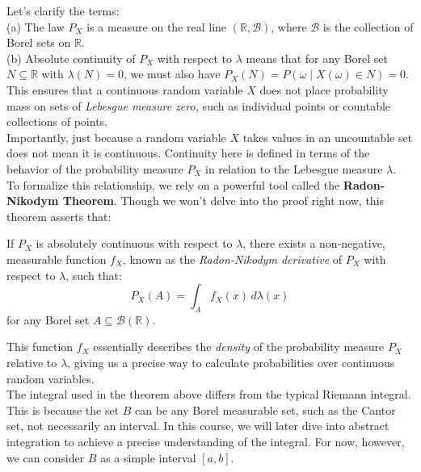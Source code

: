 Let’s clarify the terms:\\

(a) The law \(P_X\) is a measure on the real line \((\mathbb{R}, \mathcal{B})\), where \(\mathcal{B}\) is the collection of Borel sets on \(\mathbb{R}\).\\
(b) Absolute continuity of \(P_X\) with respect to \(\lambda\) means that for any Borel set \(N \subseteq \mathbb{R}\) with \(\lambda(N) = 0\), we must also have \(P_X(N) = P(\omega \mid X(\omega) \in N) = 0\).\\

This ensures that a continuous random variable \(X\) does not place probability mass on sets of \textit{Lebesgue measure zero,} such as individual points or countable collections of points.\\

Importantly, just because a random variable \(X\) takes values in an uncountable set does not mean it is continuous. Continuity here is defined in terms of the behavior of the probability measure \(P_X\) in relation to the Lebesgue measure \(\lambda\).\\

To formalize this relationship, we rely on a powerful tool called the \textbf{Radon-Nikodym Theorem}. Though we won’t delve into the proof right now, this theorem asserts that:

\begin{theorem}
    
If \(P_X\) is absolutely continuous with respect to \(\lambda\), there exists a non-negative, measurable function \(f_X\), known as the \textit{Radon-Nikodym derivative} of \(P_X\) with respect to \(\lambda\), such that:
\[
P_X(A) = \int_A f_X(x) \, d\lambda(x)
\]
for any Borel set \(A \subseteq \mathcal{B}(\mathbb{R})\).
\end{theorem}

This function \(f_X\) essentially describes the \textit{density} of the probability measure \(P_X\) relative to \(\lambda\), giving us a precise way to calculate probabilities over continuous random variables.\\

The integral used in the theorem above differs from the typical Riemann integral. This is because the set \( B \) can be any Borel measurable set, such as the Cantor set, not necessarily an interval. In this course, we will later dive into abstract integration to achieve a precise understanding of the integral. For now, however, we can consider \( B \) as a simple interval \([a, b]\).\\

